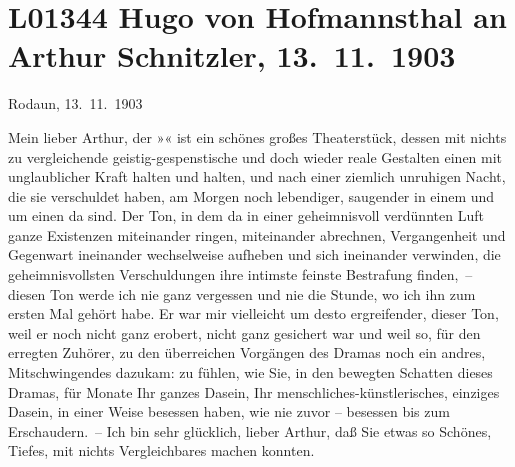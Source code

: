 

\section[Hugo von Hofmannsthal an Arthur Schnitzler, 13. 11. 1903]{L01344 Hugo von Hofmannsthal an Arthur Schnitzler, 13. 11. 1903}
\nopagebreak{}
\rehead{ }\normalsize\beginnumbering{}
\toendnotes[C]{\smallbreak\pagebreak[2]}\toendnotes[C]{\smallbreak}
\pstart
           \raggedleft{}{\pb}Rodaun, 13. 11. 1903\pend
           
\pstart{}Mein lieber Arthur, \pend\vspace{0.5em}
\pstart
           der »« ist ein schönes großes Theaterstück, dessen mit nichts zu vergleichende
               geistig-gespenstische und doch wieder reale Gestalten einen mit unglaublicher Kraft
               halten und halten, und nach einer ziemlich unruhigen Nacht, die sie verschuldet
               haben, am Morgen noch lebendiger, saugender in einem und um einen da sind. Der Ton,
               in dem da in einer geheimnisvoll verdünnten Luft ganze Existenzen miteinander ringen,
               miteinander abrechnen, Vergangenheit und Gegenwart ineinander wechselweise aufheben
               und sich ineinander verwinden, die geheimnisvollsten Verschuldungen ihre intimste
               feinste Bestrafung finden, – diesen Ton werde ich nie ganz vergessen und nie die
               Stunde, wo ich ihn zum ersten Mal gehört habe. Er war mir vielleicht um desto
               ergreifender, dieser Ton, weil er noch nicht ganz erobert, nicht ganz gesichert war
               und weil so, für den erregten Zuhörer, zu den überreichen Vorgängen des Dramas noch
               ein andres, Mitschwingendes dazukam: zu fühlen, wie Sie, in den bewegten Schatten
               dieses Dramas, für Monate Ihr ganzes Dasein, Ihr menschliches-künstlerisches,
               einziges Dasein, in einer Weise besessen haben, wie nie zuvor – besessen bis zum
               Erschaudern. – Ich bin sehr glücklich, lieber Arthur, daß Sie etwas so Schönes,
               Tiefes, mit nichts Vergleichbares machen konnten.\pend
           

